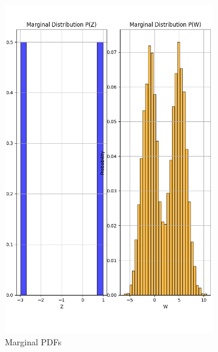 \documentclass{article}
\begin{document}
\begin{figure}[H]
  \centering
  \begin{subfigure}{0.45\textwidth}
    \centering
    \includegraphics[width=\linewidth]{results/section3/e(1).png}
    \caption{Marginal PDFs}
  \end{subfigure}
  \hfill
  \begin{subfigure}{0.45\textwidth}
    \centering

\end{subfigure}
\end{figure}
\end{document}
